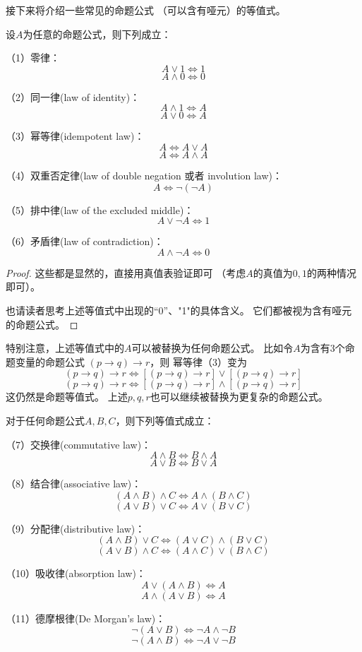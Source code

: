 接下来将介绍一些常见的命题公式
（可以含有哑元）的等值式。

\begin{thm}[基本的命题公式等值式I]
\label{prop-dingzhi-gongshi-1}
设$A$为任意的命题公式，则下列成立：

（1）零律：$$A\vee1\Leftrightarrow1$$
$$A\wedge0\Leftrightarrow0$$

（2）同一律(law of identity)：
$$A\wedge1\Leftrightarrow A$$
$$A\vee0\Leftrightarrow A$$

（3）幂等律(idempotent law)：
$$A\Leftrightarrow A\vee A$$
$$A\Leftrightarrow A\wedge A$$

（4）双重否定律(law of double negation 或者 involution law)：
$$A\Leftrightarrow \neg(\neg A)$$

（5）排中律(law of the excluded middle)：
$$A\vee\neg A\Leftrightarrow1$$

（6）矛盾律(law of contradiction)：
$$A\wedge\neg A\Leftrightarrow0$$

\end{thm}
\begin{proof}
这些都是显然的，直接用真值表验证即可
（考虑$A$的真值为$0,1$的两种情况即可）。

也请读者思考上述等值式中出现的“0”、"1"的具体含义。
它们都被视为含有哑元的命题公式。
\end{proof}

特别注意，上述等值式中的$A$可以被替换为任何命题公式。
比如令$A$为含有3个命题变量的命题公式
$(p\rightarrow q)\rightarrow r$，则
幂等律（3）变为
$$(p\rightarrow q)\rightarrow r
\Leftrightarrow [(p\rightarrow q)\rightarrow r]
\vee [(p\rightarrow q)\rightarrow r]$$
$$(p\rightarrow q)\rightarrow r
\Leftrightarrow [(p\rightarrow q)\rightarrow r]
\wedge [(p\rightarrow q)\rightarrow r]$$
这仍然是命题等值式。
上述$p,q,r$也可以继续被替换为更复杂的命题公式。

\begin{thm}[基本的命题公式等值式II]\label{prop-dengzhi-gongshi-2}
对于任何命题公式$A,B,C$，则下列等值式成立：

（7）交换律(commutative law)：
$$A\wedge B\Leftrightarrow B\wedge A$$
$$A\vee B\Leftrightarrow B\vee A$$

（8）结合律(associative law)：
$$(A\wedge B)\wedge C\Leftrightarrow A\wedge (B\wedge C)$$
$$(A\vee B)\vee C\Leftrightarrow A\vee (B\vee C)$$

（9）分配律(distributive law)：
$$(A\wedge B)\vee C\Leftrightarrow (A\vee C)\wedge (B\vee C)$$
$$(A\vee B)\wedge C\Leftrightarrow (A\wedge C)\vee (B\wedge C)$$

（10）吸收律(absorption law)：
$$A\vee (A\wedge B)\Leftrightarrow A$$
$$A\wedge (A\vee B)\Leftrightarrow A$$

（11）德摩根律(De Morgan's law)：
$$\neg(A\vee B)\Leftrightarrow\neg A\wedge\neg B$$
$$\neg(A\wedge B)\Leftrightarrow\neg A\vee\neg B$$

\end{thm}

